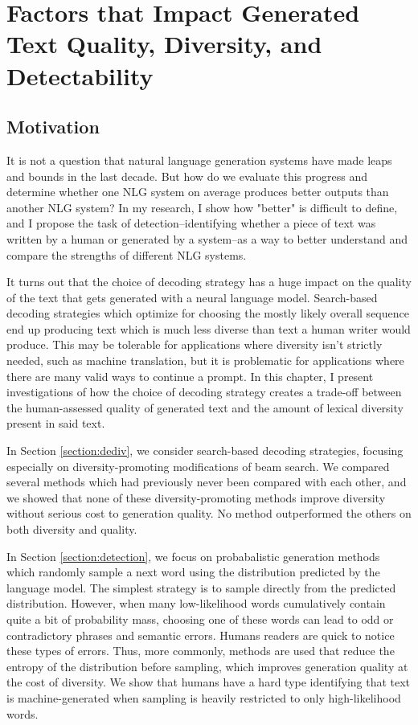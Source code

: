 \chapter{Factors that Impact Generated Text Quality, Diversity, and Detectability}
\label{chap:decoding}

\section{Motivation}
It is not a question that natural language generation systems have made leaps and bounds in the last decade.
But how do we evaluate this progress and determine whether one NLG system on average produces better outputs than another NLG system?
In my research, I show how "better" is difficult to define, and I propose the task of detection--identifying whether a piece of text was written by a human or generated by a system--as a way to better understand and compare the strengths of different NLG systems. 

It turns out that the choice of decoding strategy has a huge impact on the quality of the text that gets generated with a neural language model.
Search-based decoding strategies which optimize for choosing the mostly likely overall sequence end up producing text which is much less diverse than text a human writer would produce.
This may be tolerable for applications where diversity isn't strictly needed, such as machine translation, but it is problematic for applications where there are many valid ways to continue a prompt.
In this chapter, I present investigations of how the choice of decoding strategy creates a trade-off between the human-assessed quality of generated text and the amount of lexical diversity present in said text.

In Section \ref{section:dediv}, we consider search-based decoding strategies, focusing especially on diversity-promoting modifications of beam search.
We compared several methods which had previously never been compared with each other, and we showed that none of these diversity-promoting methods improve diversity without serious cost to generation quality.
No method outperformed the others on both diversity and quality.

In Section \ref{section:detection}, we focus on probabalistic generation methods which randomly sample a next word using the distribution predicted by the language model.
The simplest strategy is to sample directly from the predicted distribution.
However, when many low-likelihood words cumulatively contain quite a bit of probability mass, choosing one of these words can lead to odd or contradictory phrases and semantic errors.
Humans readers are quick to notice these types of errors.
Thus, more commonly, methods are used that reduce the entropy of the distribution before sampling, which improves generation quality at the cost of diversity.
We show that humans have a hard type identifying that text is machine-generated when sampling is heavily restricted to only high-likelihood words.

